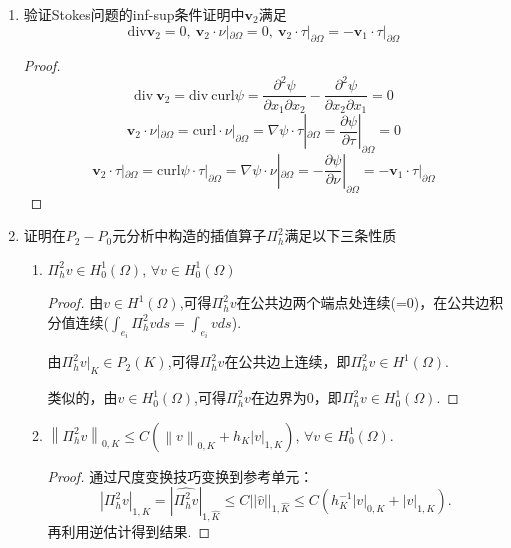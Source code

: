 \documentclass[12pt,a4paper]{article}
\begin{document}
	\begin{enumerate}
		
		\item 验证Stokes问题的inf-sup条件证明中$\mathbf{v}_2$满足
		$$\mathrm{div} \mathbf{v}_2=0,\:\mathbf{v}_2\cdot\nu|_{\partial\Omega}=0,\:\mathbf{v}_2\cdot\tau|_{\partial\Omega}=-\mathbf{v}_1\cdot\tau|_{\partial\Omega}$$
		
		\begin{proof}
			$$\mathrm{div} \  \mathbf{v}_2 = \mathrm{div} \ \mathrm{curl} \psi = \frac{\partial^2 \psi}{\partial x_1 \partial x_2} - \frac{\partial^2 \psi}{\partial x_2 \partial x_1} = 0  $$
			$$\mathbf{v}_2\cdot\nu|_{\partial\Omega}=\mathrm{curl} \cdot \nu|_{\partial \Omega}=\nabla \psi \cdot \tau |_{\partial \Omega}=\frac{\partial \psi}{\partial \tau} |_{\partial\Omega}=0$$
			$$\mathbf{v}_2\cdot\tau|_{\partial\Omega}=\mathrm{curl} \psi \cdot \tau|_{\partial\Omega}=\nabla \psi \cdot \nu |_{\partial\Omega}=- \frac{\partial \psi}{\partial \nu}|_{\partial \Omega}=-\mathbf{v}_1\cdot\tau|_{\partial\Omega}$$
		\end{proof}
		
		\item 证明在$P_2-P_0$元分析中构造的插值算子$\Pi_h^{2}$满足以下三条性质
		
		\begin{enumerate}
			\item $\Pi _{h}^{2}v\in H_{0}^{1}( \Omega )$, $\forall v\in H_{0}^{1}( \Omega )$
			
			\begin{proof}
				由$v \in H^1(\Omega)$,可得$\Pi_h^2 v$在公共边两个端点处连续(=0)，在公共边积分值连续($\int_{e_i} \Pi_h^2 v ds= \int_{e_i} v ds$).
				
				由$\Pi_h^2 v|_K \in P_2(K)$,可得$\Pi_h^2 v$在公共边上连续，即$\Pi_h^2 v \in H^1(\Omega)$.
				
				类似的，由$v \in H_0^1(\Omega)$,可得$\Pi_h^2 v$在边界为0，即$\Pi_h^2 v \in H_0^1(\Omega)$.
			\end{proof}
			
			\item $ \left \| \Pi _h^2v\right \| _{0, K}\leq C\left ( \left \| v\right \| _{0, K}+ h_K\left | v\right | _{1, K}\right )$, $\forall v\in H_0^1( \Omega )$.
			
			\begin{proof}
				通过尺度变换技巧变换到参考单元：
				$$|\Pi_{h}^2{v}|_{1,K}=|\widehat{\Pi_{h}^2{v}}|_{1,\hat{K}}\leq C||\hat{v}||_{1,\hat{K}}\leq C(h_{K}^{-1}|{v}|_{0,K}+|{v}|_{1,K}).$$
				再利用逆估计得到结果.
			\end{proof}
			

\end{enumerate}
\end{enumerate}
\end{document}
